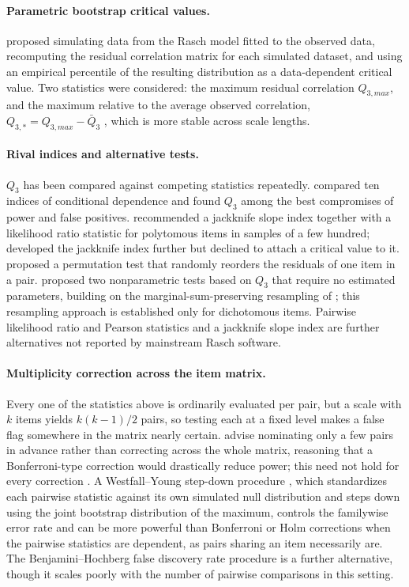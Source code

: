 \documentclass{article}
\begin{document}
\paragraph{Parametric bootstrap critical values.}
\citet{christensen2017} proposed simulating data from the Rasch model fitted to the observed
data, recomputing the residual correlation matrix for each simulated dataset, and using an
empirical percentile of the resulting distribution as a data-dependent critical value. Two
statistics were considered: the maximum residual correlation $Q_{3,max}$, and the maximum relative
to the average observed correlation, $Q_{3,*} = Q_{3,max} - \bar{Q}_3$ \citep{marais2013}, which is
more stable across scale lengths.

\paragraph{Rival indices and alternative tests.}
$Q_3$ has been compared against competing statistics repeatedly. \citet{kim2011} compared ten
indices of conditional dependence and found $Q_3$ among the best compromises of power and false
positives. \citet{houtsedwards2013} recommended a jackknife slope index together with a
likelihood ratio statistic for polytomous items in samples of a few hundred; \citet{edwards2018}
developed the jackknife index further but declined to attach a critical value to it.
\citet{finchjeffers2016} proposed a permutation test that randomly reorders the residuals of one
item in a pair. \citet{debelakkoller2020} proposed two nonparametric tests based on $Q_3$ that
require no estimated parameters, building on the marginal-sum-preserving resampling of
\citet{ponocny2001}; this resampling approach is established only for dichotomous items. Pairwise
likelihood ratio and Pearson statistics \citep{chenthissen1997} and a jackknife slope index
\citep{edwards2018} are further alternatives not reported by mainstream Rasch software.

\paragraph{Multiplicity correction across the item matrix.}
Every one of the statistics above is ordinarily evaluated per pair, but a scale with $k$ items
yields $k(k-1)/2$ pairs, so testing each at a fixed level makes a false flag somewhere in the
matrix nearly certain. \citet{debelakkoller2020} advise nominating only a few pairs in advance
rather than correcting across the whole matrix, reasoning that a Bonferroni-type correction
would drastically reduce power; this need not hold for every correction \citep{ferreira2024}. A
Westfall--Young step-down procedure \citep{westfallyoung1993}, which standardizes each pairwise
statistic against its own simulated null distribution and steps down using the joint bootstrap
distribution of the maximum, controls the familywise error rate and can be more powerful than
Bonferroni or Holm corrections when the pairwise statistics are dependent, as pairs sharing an
item necessarily are. The Benjamini--Hochberg false discovery rate procedure
\citep{benjaminihochberg1995} is a further alternative, though it scales poorly with the number
of pairwise comparisons in this setting.
\end{document}
